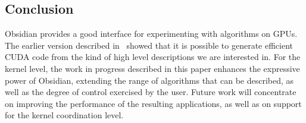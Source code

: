 
\subsection{Conclusion} \label{sec:conc}

Obsidian provides a good interface for experimenting with algorithms on GPUs. 
The earlier version described in~\cite{JMT} showed that it is possible to 
generate efficient CUDA code from the kind of high level descriptions we are 
interested in. For the kernel level, the work in progress described in this paper enhances the  expressive power of Obsidian, extending the range of algorithms that can be described, as well as the degree of control exercised by the user. 
Future work will concentrate on improving the performance of the resulting 
applications, as well as on support for the kernel coordination level.
